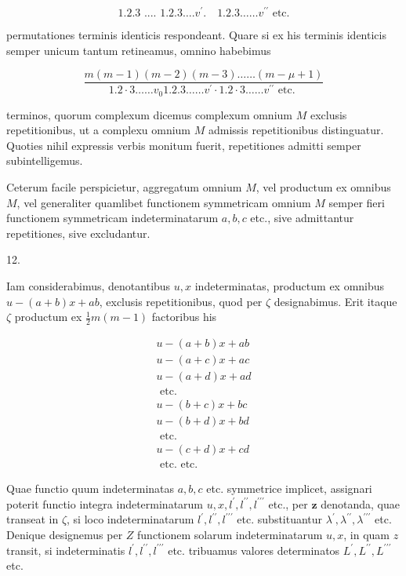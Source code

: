 \documentclass[10pt]{article}
\begin{document}
\[
\text { 1.2.3 .... } 1.2 .3 \ldots . v^{\prime} . \quad 1.2 .3 \ldots \ldots v^{\prime \prime} \text { etc. }
\]

permutationes terminis identicis respondeant. Quare si ex his terminis identicis semper unicum tantum retineamus, omnino habebimus

\[
\frac{m(m-1)(m-2)(m-3) \ldots \ldots(m-\mu+1)}{1.2 \cdot 3 \ldots \ldots v_{0} 1.2 .3 \ldots \ldots v^{\prime} \cdot 1.2 \cdot 3 \ldots \ldots v^{\prime \prime} \text { etc. }}
\]

terminos, quorum complexum dicemus complexum omnium \(M\) exclusis repetitionibus, ut a complexu omnium \(M\) admissis repetitionibus distinguatur. Quoties nihil expressis verbis monitum fuerit, repetitiones admitti semper subintelligemus.

Ceterum facile perspicietur, aggregatum omnium \(M\), vel productum ex omnibus \(M\), vel generaliter quamlibet functionem symmetricam omnium \(M\) semper fieri functionem symmetricam indeterminatarum \(a, b, c\) etc., sive admittantur repetitiones, sive excludantur.

12.

Iam considerabimus, denotantibus \(u, x\) indeterminatas, productum ex omnibus \(u-(a+b) x+a b\), exclusis repetitionibus, quod per \(\zeta\) designabimus. Erit itaque \(\zeta\) productum ex \(\frac{1}{2} m(m-1)\) factoribus his

\[
\begin{gathered}
u-(a+b) x+a b \\
u-(a+c) x+a c \\
u-(a+d) x+a d \\
\text { etc. } \\
u-(b+c) x+b c \\
u-(b+d) x+b d \\
\text { etc. } \\
u-(c+d) x+c d \\
\text { etc. etc. }
\end{gathered}
\]

Quae functio quum indeterminatas \(a, b, c\) etc. symmetrice implicet, assignari poterit functio integra indeterminatarum \(u, x, l^{\prime}, l^{\prime \prime}, l^{\prime \prime \prime}\) etc., per \(\boldsymbol{z}\) denotanda, quae transeat in \(\zeta\), si loco indeterminatarum \(l^{\prime}, l^{\prime \prime}, l^{\prime \prime \prime}\) etc. substituantur \(\lambda^{\prime}, \lambda^{\prime \prime}, \lambda^{\prime \prime \prime}\) etc. Denique designemus per \(Z\) functionem solarum indeterminatarum \(u, x\), in quam \(z\) transit, si indeterminatis \(l^{\prime}, l^{\prime \prime}, l^{\prime \prime \prime}\) etc. tribuamus valores determinatos \(L^{\prime}, L^{\prime \prime}, L^{\prime \prime \prime}\) etc.
\end{document}
